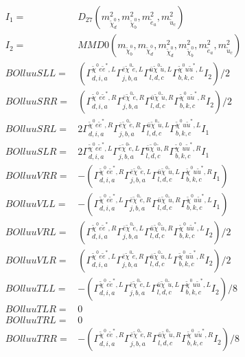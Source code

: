 \documentclass[A4,landscape]{article}
\begin{document}
\begin{align} 
I_1 = & D_{27}(m^2_{\tilde{\chi}^0_{{d}}}, m^2_{\tilde{\chi}^0_{{b}}}, m^2_{\tilde{e}_{{a}}}, m^2_{\tilde{u}_{{c}}}) \\ 
I_2 = & MMD0(m_{\tilde{\chi}^0_{{b}}}, m_{\tilde{\chi}^0_{{d}}}, m^2_{\tilde{\chi}^0_{{d}}}, m^2_{\tilde{\chi}^0_{{b}}}, m^2_{\tilde{e}_{{a}}}, m^2_{\tilde{u}_{{c}}}) \\ 
  BOlluuSLL= & ( \Gamma^{\tilde{\chi}^0 e \tilde{e}^*,L}_{d, i, a} \Gamma^{\bar{e}\tilde{\chi}^0 \tilde{e} ,L}_{j, b, a} \Gamma^{\bar{u}\tilde{\chi}^0 \tilde{u} ,L}_{l, d, c} \Gamma^{\tilde{\chi}^0 u \tilde{u}^*,L}_{b, k, c} I_2)/2 \\ 
  BOlluuSRR= & ( \Gamma^{\tilde{\chi}^0 e \tilde{e}^*,R}_{d, i, a} \Gamma^{\bar{e}\tilde{\chi}^0 \tilde{e} ,R}_{j, b, a} \Gamma^{\bar{u}\tilde{\chi}^0 \tilde{u} ,R}_{l, d, c} \Gamma^{\tilde{\chi}^0 u \tilde{u}^*,R}_{b, k, c} I_2)/2 \\ 
  BOlluuSRL= & 2  \Gamma^{\tilde{\chi}^0 e \tilde{e}^*,R}_{d, i, a} \Gamma^{\bar{e}\tilde{\chi}^0 \tilde{e} ,R}_{j, b, a} \Gamma^{\bar{u}\tilde{\chi}^0 \tilde{u} ,L}_{l, d, c} \Gamma^{\tilde{\chi}^0 u \tilde{u}^*,L}_{b, k, c} I_1 \\ 
  BOlluuSLR= & 2  \Gamma^{\tilde{\chi}^0 e \tilde{e}^*,L}_{d, i, a} \Gamma^{\bar{e}\tilde{\chi}^0 \tilde{e} ,L}_{j, b, a} \Gamma^{\bar{u}\tilde{\chi}^0 \tilde{u} ,R}_{l, d, c} \Gamma^{\tilde{\chi}^0 u \tilde{u}^*,R}_{b, k, c} I_1 \\ 
  BOlluuVRR= & -( \Gamma^{\tilde{\chi}^0 e \tilde{e}^*,R}_{d, i, a} \Gamma^{\bar{e}\tilde{\chi}^0 \tilde{e} ,L}_{j, b, a} \Gamma^{\bar{u}\tilde{\chi}^0 \tilde{u} ,L}_{l, d, c} \Gamma^{\tilde{\chi}^0 u \tilde{u}^*,R}_{b, k, c} I_1) \\ 
  BOlluuVLL= & -( \Gamma^{\tilde{\chi}^0 e \tilde{e}^*,L}_{d, i, a} \Gamma^{\bar{e}\tilde{\chi}^0 \tilde{e} ,R}_{j, b, a} \Gamma^{\bar{u}\tilde{\chi}^0 \tilde{u} ,R}_{l, d, c} \Gamma^{\tilde{\chi}^0 u \tilde{u}^*,L}_{b, k, c} I_1) \\ 
  BOlluuVRL= & ( \Gamma^{\tilde{\chi}^0 e \tilde{e}^*,R}_{d, i, a} \Gamma^{\bar{e}\tilde{\chi}^0 \tilde{e} ,L}_{j, b, a} \Gamma^{\bar{u}\tilde{\chi}^0 \tilde{u} ,R}_{l, d, c} \Gamma^{\tilde{\chi}^0 u \tilde{u}^*,L}_{b, k, c} I_2)/2 \\ 
  BOlluuVLR= & ( \Gamma^{\tilde{\chi}^0 e \tilde{e}^*,L}_{d, i, a} \Gamma^{\bar{e}\tilde{\chi}^0 \tilde{e} ,R}_{j, b, a} \Gamma^{\bar{u}\tilde{\chi}^0 \tilde{u} ,L}_{l, d, c} \Gamma^{\tilde{\chi}^0 u \tilde{u}^*,R}_{b, k, c} I_2)/2 \\ 
  BOlluuTLL= & -( \Gamma^{\tilde{\chi}^0 e \tilde{e}^*,L}_{d, i, a} \Gamma^{\bar{e}\tilde{\chi}^0 \tilde{e} ,L}_{j, b, a} \Gamma^{\bar{u}\tilde{\chi}^0 \tilde{u} ,L}_{l, d, c} \Gamma^{\tilde{\chi}^0 u \tilde{u}^*,L}_{b, k, c} I_2)/8 \\ 
  BOlluuTLR= & 0 \\ 
  BOlluuTRL= & 0 \\ 
  BOlluuTRR= & -( \Gamma^{\tilde{\chi}^0 e \tilde{e}^*,R}_{d, i, a} \Gamma^{\bar{e}\tilde{\chi}^0 \tilde{e} ,R}_{j, b, a} \Gamma^{\bar{u}\tilde{\chi}^0 \tilde{u} ,R}_{l, d, c} \Gamma^{\tilde{\chi}^0 u \tilde{u}^*,R}_{b, k, c} I_2)/8 \\ 
\end{align} 
\end{document}
